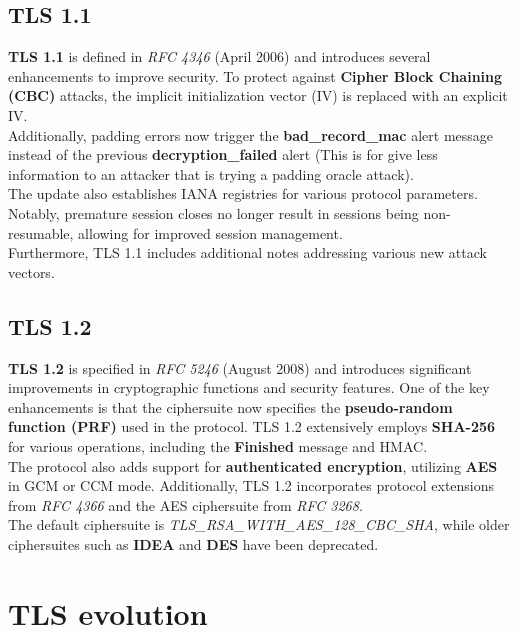 \subsection{TLS 1.1}
\textbf{TLS 1.1} is defined in \textit{RFC 4346} (April 2006) and introduces several enhancements to improve security. To protect against \textbf{Cipher Block Chaining (CBC)} attacks, the implicit initialization vector (IV) is replaced with an explicit IV. \\ Additionally, padding errors now trigger the \textbf{bad\_record\_mac} alert message instead of the previous \textbf{decryption\_failed} alert (This is for give less information to an attacker that is trying a padding oracle attack). \\ The update also establishes IANA registries for various protocol parameters. Notably, premature session closes no longer result in sessions being non-resumable, allowing for improved session management.\\ Furthermore, TLS 1.1 includes additional notes addressing various new attack vectors.

\subsection{TLS 1.2}
\textbf{TLS 1.2} is specified in \textit{RFC 5246} (August 2008) and introduces significant improvements in cryptographic functions and security features. One of the key enhancements is that the ciphersuite now specifies the \textbf{pseudo-random function (PRF)} used in the protocol. TLS 1.2 extensively employs \textbf{SHA-256} for various operations, including the \textbf{Finished} message and HMAC. \\ The protocol also adds support for \textbf{authenticated encryption}, utilizing \textbf{AES} in GCM or CCM mode. Additionally, TLS 1.2 incorporates protocol extensions from \textit{RFC 4366} and the AES ciphersuite from \textit{RFC 3268}. \\
The default ciphersuite is \textit{TLS\_RSA\_WITH\_AES\_128\_CBC\_SHA}, while older ciphersuites such as \textbf{IDEA} and \textbf{DES} have been deprecated.


\section{TLS evolution}
